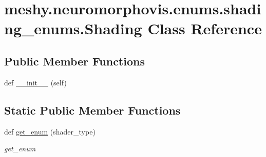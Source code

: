 \hypertarget{classmeshy_1_1neuromorphovis_1_1enums_1_1shading__enums_1_1Shading}{}\section{meshy.\+neuromorphovis.\+enums.\+shading\+\_\+enums.\+Shading Class Reference}
\label{classmeshy_1_1neuromorphovis_1_1enums_1_1shading__enums_1_1Shading}


 


\subsection*{Public Member Functions}
\begin{DoxyCompactItemize}
\item 
def \hyperlink{classmeshy_1_1neuromorphovis_1_1enums_1_1shading__enums_1_1Shading_a5f02d61ee28386cab39ff9d625b29e6b}{\+\_\+\+\_\+init\+\_\+\+\_\+} (self)\hypertarget{classmeshy_1_1neuromorphovis_1_1enums_1_1shading__enums_1_1Shading_a5f02d61ee28386cab39ff9d625b29e6b}{}\label{classmeshy_1_1neuromorphovis_1_1enums_1_1shading__enums_1_1Shading_a5f02d61ee28386cab39ff9d625b29e6b}

\end{DoxyCompactItemize}
\subsection*{Static Public Member Functions}
\begin{DoxyCompactItemize}
\item 
def \hyperlink{classmeshy_1_1neuromorphovis_1_1enums_1_1shading__enums_1_1Shading_a532a89f44bc49bf59bea1c69cff66154}{get\+\_\+enum} (shader\+\_\+type)
\begin{DoxyCompactList}\small\item\em get\+\_\+enum \end{DoxyCompactList}\end{DoxyCompactItemize}
